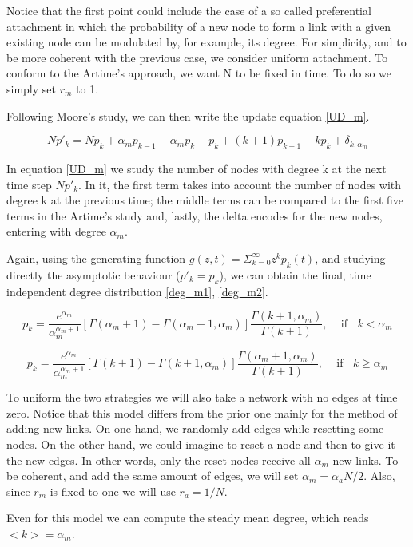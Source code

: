 Notice that the first point could include the case of a so called preferential attachment in which the probability of a new node to form a link with a given existing node can be modulated by, for example, its degree. For simplicity, and to be more coherent with the previous case, we consider uniform attachment. To conform to the Artime's approach, we want N to be fixed in time. To do so we simply set $r_m$ to 1. 

Following Moore's study, we can then write the update equation \eqref{UD_m}.

\begin{equation}
N p'_k = N p_k + \alpha_m p_{k-1} - \alpha_m p_k - p_k + (k+1)p_{k+1} - kp_k + \delta_{k,\alpha_m}  \label{UD_m}
\end{equation}

In equation \eqref{UD_m} we study the number of nodes with degree k at the next time step $Np'_k$. In it, the first term takes into account the number of nodes with degree k at the previous time; the middle terms can be compared to the first five terms in the Artime's study and, lastly, the delta encodes for the new nodes, entering with degree $\alpha_m$.

Again, using the generating function $g(z,t)=\Sigma_{k=0}^{\infty}z^k p_k (t)$, and studying directly the asymptotic behaviour ($p'_k=p_k$), we can obtain the final, time independent degree distribution \eqref{deg_m1}, \eqref{deg_m2}.

\begin{equation}
p_k = \frac{e^{\alpha_m}}{\alpha_m^{\alpha_m+1}}[\Gamma(\alpha_m+1) - \Gamma(\alpha_m+1,\alpha_m)]\frac{\Gamma(k+1,\alpha_m)}{\Gamma(k+1)}, \;\;\;\text{ if }\;\; k<\alpha_m\label{deg_m1}
\end{equation}

\begin{equation}
p_k = \frac{e^{\alpha_m}}{\alpha_m^{\alpha_m+1}}[\Gamma(k+1) - \Gamma(k+1,\alpha_m)]\frac{\Gamma(\alpha_m+1,\alpha_m)}{\Gamma(k+1)}, \;\;\;\text{ if }\;\; k\geq \alpha_m\label{deg_m2}
\end{equation}

To uniform the two strategies we will also take a network with no edges at time zero. Notice that this model differs from the prior one mainly for the method of adding new links. On one hand, we randomly add edges while resetting some nodes. On the other hand, we could imagine to reset a node and then to give it the new edges. In other words, only the reset nodes receive all $\alpha_m$ new links. To be coherent, and add the same amount of edges, we will set $\alpha_m = \alpha_a N/2$. Also, since $r_m$ is fixed to one we will use $r_a=1/N$.

Even for this model we can compute the steady mean degree, which reads $\;\;$ $<k>=\alpha_m$.

\newpage